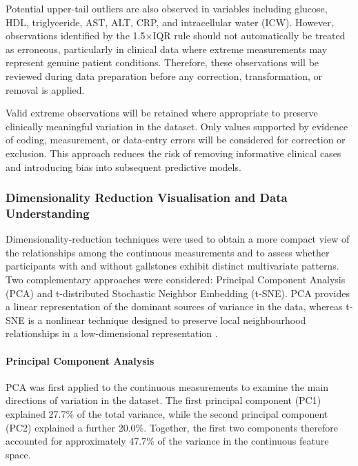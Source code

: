 Potential upper-tail outliers are also observed in variables including glucose, HDL, triglyceride, AST, ALT, CRP, and intracellular water (ICW). However, observations identified by the 1.5$\times$IQR rule should not automatically be treated as erroneous, particularly in clinical data where extreme measurements may represent genuine patient conditions. Therefore, these observations will be reviewed during data preparation before any correction, transformation, or removal is applied.

Valid extreme observations will be retained where appropriate to preserve clinically meaningful variation in the dataset. Only values supported by evidence of coding, measurement, or data-entry errors will be considered for correction or exclusion. This approach reduces the risk of removing informative clinical cases and introducing bias into subsequent predictive models.


\subsubsection{Dimensionality Reduction Visualisation and Data Understanding}
\label{subsubsec:dimensionality_reduction}

Dimensionality-reduction techniques were used to obtain a more compact view of
the relationships among the continuous measurements and to assess whether
participants with and without gallstones exhibit distinct multivariate patterns.
Two complementary approaches were considered: Principal Component Analysis
(PCA) and t-distributed Stochastic Neighbor Embedding (t-SNE). PCA provides a
linear representation of the dominant sources of variance in the data, whereas
t-SNE is a nonlinear technique designed to preserve local neighbourhood
relationships in a low-dimensional representation
\parencite{vandermaaten2008tsne}.

\paragraph{Principal Component Analysis}

PCA was first applied to the continuous measurements to examine the main
directions of variation in the dataset. The first principal component (PC1)
explained 27.7\% of the total variance, while the second principal component
(PC2) explained a further 20.0\%. Together, the first two components therefore
accounted for approximately 47.7\% of the variance in the continuous feature
space.

